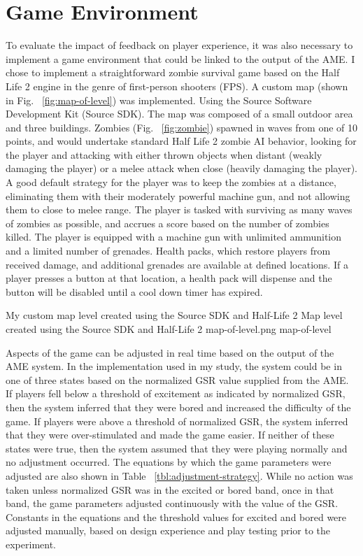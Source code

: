 \section{Game Environment}
To evaluate the impact of feedback on player experience, it was also necessary to implement a game environment that could be linked to the output of the AME. I chose to implement a straightforward zombie survival game based on the Half Life 2 engine in the genre of first-person shooters (FPS). A custom map (shown in Fig. ~\ref{fig:map-of-level}) was implemented. Using the Source Software Development Kit (Source SDK). The map was composed of a small outdoor area and three buildings. Zombies (Fig. ~\ref{fig:zombie}) spawned in waves from one of 10 points, and would undertake standard Half Life 2 zombie AI behavior, looking for the player and attacking with either thrown objects when distant (weakly damaging the player) or a melee attack when close (heavily damaging the player). A good default strategy for the player was to keep the zombies at a distance, eliminating them with their moderately powerful machine gun, and not allowing them to close to melee range. The player is tasked with surviving as many waves of zombies as possible, and accrues a score based on the number of zombies killed. The player is equipped with a machine gun with unlimited ammunition and a limited number of grenades. Health packs, which restore players from received damage, and additional grenades are available at defined locations. If a player presses a button at that location, a health pack will dispense and the button will be disabled until a cool down timer has expired.%

\largeimg
{My custom map level created using the Source SDK and Half-Life 2}
{Map level created using the Source SDK and Half-Life 2}
{map-of-level.png}
{map-of-level}

Aspects of the game can be adjusted in real time based on the output of the AME system. In the implementation used in my study, the system could be in one of three states based on the normalized GSR value supplied from the AME. If players fell below a threshold of excitement as indicated by normalized GSR, then the system inferred that they were bored and increased the difficulty of the game. If players were above a threshold of normalized GSR, the system inferred that they were over-stimulated and made the game easier. If neither of these states were true, then the system assumed that they were playing normally and no adjustment occurred. The equations by which the game parameters were adjusted are also shown in Table ~\ref{tbl:adjustment-strategy}. While no action was taken unless normalized GSR was in the excited or bored band, once in that band, the game parameters adjusted continuously with the value of the GSR. Constants in the equations and the threshold values for excited and bored were adjusted manually, based on design experience and play testing prior to the experiment.

